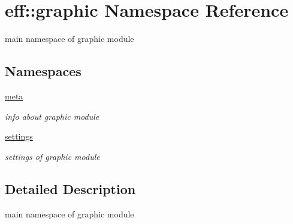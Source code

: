 \hypertarget{namespaceeff_1_1graphic}{}\section{eff\+:\+:graphic Namespace Reference}
\label{namespaceeff_1_1graphic}


main namespace of graphic module  


\subsection*{Namespaces}
\begin{DoxyCompactItemize}
\item 
 \hyperlink{namespaceeff_1_1graphic_1_1meta}{meta}
\begin{DoxyCompactList}\small\item\em info about graphic module \end{DoxyCompactList}\item 
 \hyperlink{namespaceeff_1_1graphic_1_1settings}{settings}
\begin{DoxyCompactList}\small\item\em settings of graphic module \end{DoxyCompactList}\end{DoxyCompactItemize}


\subsection{Detailed Description}
main namespace of graphic module 